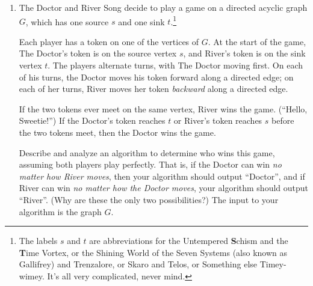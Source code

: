 \begin{exercises}
\begin{enumerate}[label=\arabic*.,ref=\thechapter.\arabic*,leftmargin=*,align=left,itemsep=1.5ex plus 0.5ex,start=12]
Judy has decided to take a sabbatical tour of the universe by visiting as many galaxies as possible, starting at her home galaxy.
To save on travel expenses, she wants to teleport away from her home galaxy at every step, except for the very last teleport home.
\begin{enumerate}
\item Describe and analyze an algorithm to compute the maximum number of galaxies that Judy can visit.
Your input consists of an undirected graph $G$ with $n$ vertices and $m$ edges describing the teleport-way network, an integer $1 \le s \le n$ identifying Judy’s home galaxy, and an array $D[1\,..\,n]$ containing the distances of each galaxy from $s$.
\item {} Just before embarking on her universal tour, Judy wins the space lottery, giving her just enough money to afford \textit{two} teleports toward her home galaxy.
Describe a new algorithm to compute the maximum number of distinct galaxies Judy can visit.
She can visit the same galaxy more than once, but crucially, only the first visit counts toward her total.
\end{enumerate}

\item The Doctor and River Song decide to play a game on a directed acyclic graph $G$, which has one source $s$ and one sink $t$.\footnote{The labels $s$ and $t$ are abbreviations for the Untempered {\bfseries S}chism and the {\bfseries T}ime Vortex, or the Shining World of the Seven Systems (also known as Gallifrey) and Trenzalore, or Skaro and Telos, or Something else Timey-wimey. It’s all very complicated, never mind.}

Each player has a token on one of the vertices of $G$.
At the start of the game, The Doctor’s token is on the source vertex $s$, and River’s token is on the sink vertex $t$.
The players alternate turns, with The Doctor moving first.
On each of his turns, the Doctor moves his token forward along a directed edge; on each of her turns, River moves her token \textit{backward} along a directed edge.

If the two tokens ever meet on the same vertex, River wins the game.
(“Hello, Sweetie!”) If the Doctor’s token reaches $t$ or River’s token reaches $s$ before the two tokens meet, then the Doctor wins the game.

Describe and analyze an algorithm to determine who wins this game, assuming both players play perfectly.
That is, if the Doctor can win \textit{no matter how River moves}, then your algorithm should output “Doctor”, and if River can win \textit{no matter how the Doctor moves}, your algorithm should output “River”.
(Why are these the only two possibilities?)
The input to your algorithm is the graph $G$.


\end{enumerate}
\end{exercises}
